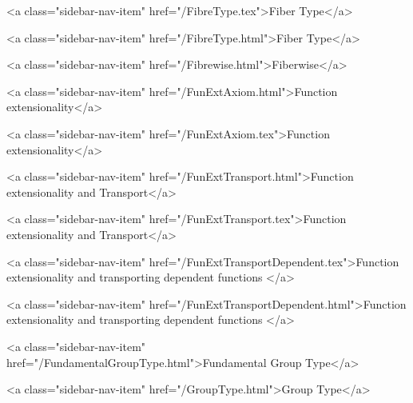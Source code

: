          <a class="sidebar-nav-item" href="/FibreType.tex">Fiber Type</a>
        
      
    
      
        
          <a class="sidebar-nav-item" href="/FibreType.html">Fiber Type</a>
        
      
    
      
        
          <a class="sidebar-nav-item" href="/Fibrewise.html">Fiberwise</a>
        
      
    
      
        
          <a class="sidebar-nav-item" href="/FunExtAxiom.html">Function extensionality</a>
        
      
    
      
        
          <a class="sidebar-nav-item" href="/FunExtAxiom.tex">Function extensionality</a>
        
      
    
      
        
          <a class="sidebar-nav-item" href="/FunExtTransport.html">Function extensionality and Transport</a>
        
      
    
      
        
          <a class="sidebar-nav-item" href="/FunExtTransport.tex">Function extensionality and Transport</a>
        
      
    
      
        
          <a class="sidebar-nav-item" href="/FunExtTransportDependent.tex">Function extensionality and transporting dependent functions </a>
        
      
    
      
        
          <a class="sidebar-nav-item" href="/FunExtTransportDependent.html">Function extensionality and transporting dependent functions </a>
        
      
    
      
        
          <a class="sidebar-nav-item" href="/FundamentalGroupType.html">Fundamental Group Type</a>
        
      
    
      
        
          <a class="sidebar-nav-item" href="/GroupType.html">Group Type</a>
        
